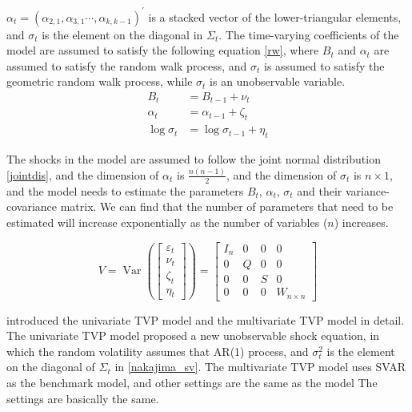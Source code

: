 \documentclass[11pt]{article}
\begin{document}
$\alpha_{t} = (\alpha_{2,1},\alpha_{3,1} \cdots, \alpha_{k,k-1})^{\prime}$ is a stacked vector of
the lower-triangular elements,
and $\sigma_{t}$ is the element on the diagonal in $\Sigma_t$.
The time-varying coefficients of the model are assumed to satisfy the following equation \eqref{rw}, 
where $B_{t}$ and $\alpha_{t}$ are assumed to satisfy the random walk process,
and $\sigma_{t}$ is assumed to satisfy the geometric random walk process, while $\sigma_{t}$ is an unobservable variable.
\begin{equation}
	\begin{aligned}
		B_{t} &=B_{t-1}+\nu_{t} \\
		\alpha_{t} &=\alpha_{t-1}+\zeta_{t} \\
		\log \sigma_{t} &=\log \sigma_{t-1}+\eta_{t}
	\end{aligned}
	\label{rw}
\end{equation}

The shocks in the model are assumed to follow the joint normal distribution \eqref{jointdis}, 
and the dimension of $\alpha_{t}$ is $\frac{n(n-1)}{2}$, and the dimension of  $\sigma_{t}$ is $n\times 1$, 
and the model needs to estimate the parameters $B_{t}$, $\alpha_{t}$, $\sigma_{t}$ and their variance-covariance matrix. 
We can find that the number of parameters that need to be estimated will increase exponentially as the number of variables ($n$) increases.

\begin{equation}
	V=\operatorname{Var}\left(\left[\begin{array}{c}
		\varepsilon_{t} \\
		\nu_{t} \\
		\zeta_{t} \\
		\eta_{t}
		\end{array}\right]\right)=\left[\begin{array}{cccc}
		I_{n} & 0 & 0 & 0 \\
		0 & Q & 0 & 0 \\
		0 & 0 & S & 0 \\
		0 & 0 & 0 & W_{n \times n}
	\end{array}\right]
	\label{jointdis}
\end{equation}

\cite{nakajima2011time} introduced the univariate TVP model and the multivariate TVP model in detail. 
The univariate TVP model  proposed a new unobservable shock equation, in which the random volatility assumes that AR(1) process,
and $\sigma_{t}^{2}$ is the element on the diagonal of $\Sigma_t$ in \eqref{nakajima_sv}. 
The multivariate TVP model uses SVAR as the benchmark model, 
and other settings are the same as the \cite{primiceri2005time} model The settings are basically the same.
\end{document}

